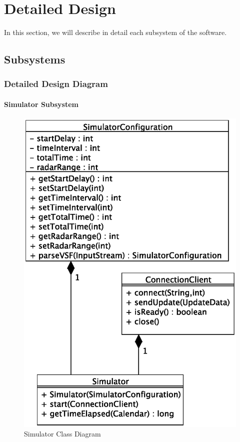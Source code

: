 \documentclass{article}
\begin{document}
\break

\section{Detailed Design} %

In this section, we will describe in detail each subsystem of the software.

\subsection{Subsystems} %

\subsubsection{Detailed Design Diagram} %

\paragraph{Simulator Subsystem} 

\begin{figure}[!htb]
\caption{Simulator Class Diagram}
\centering
\includegraphics[scale=0.6]{diagrams/simulator-class-diagram.eps}
\end{figure}
\end{document}
